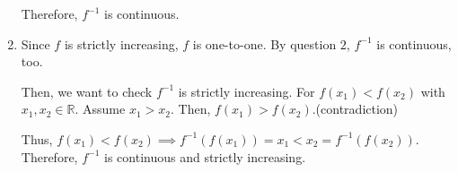 \documentclass[12pt]{article}
\begin{document}
\begin{enumerate}
    Therefore, $f^{-1}$ is continuous.
    
    \newpage
    \item Since $f$ is strictly increasing, $f$ is one-to-one.
    By question $2$, $f^{-1}$ is continuous, too.

    Then, we want to check $f^{-1}$ is strictly increasing.
    For $f(x_1) < f(x_2)$ with $x_1, x_2 \in \mathbb{R}$.
    Assume $x_1 > x_2$.
    Then, $f(x_1) > f(x_2)$.(contradiction)

    Thus, $f(x_1) < f(x_2)\implies f^{-1}(f(x_1))=x_1 < x_2 = f^{-1}(f(x_2))$.
    Therefore, $f^{-1}$ is continuous and strictly increasing.
    
\end{enumerate}
\end{document}
